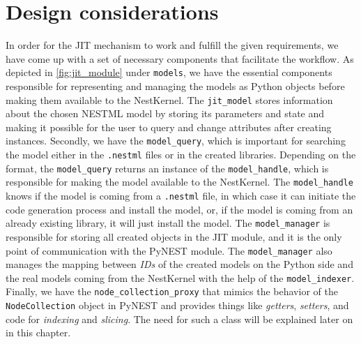 

\section{Design considerations}

In order for the JIT mechanism to work and fulfill the given requirements, we have come up with a set of necessary components that facilitate the workflow. As depicted in \autoref{fig:jit_module} under \texttt{models}, we have the essential components responsible for representing and managing the models as Python objects before making them available to the NestKernel. The \texttt{jit\_model} stores information about the chosen NESTML model by storing its parameters and state and making it possible for the user to query and change attributes after creating instances. Secondly, we have the \texttt{model\_query}, which is important for searching the model either in the \texttt{.nestml} files or in the created libraries. Depending on the format, the \texttt{model\_query} returns an instance of the \texttt{model\_handle}, which is responsible for making the model available to the NestKernel. The \texttt{model\_handle} knows if the model is coming from a \texttt{.nestml} file, in which case it can initiate the code generation process and install the model, or, if the model is coming from an already existing library, it will just install the model. The \texttt{model\_manager} is responsible for storing all created objects in the JIT module, and it is the only point of communication with the PyNEST module. The \texttt{model\_manager} also manages the mapping between \emph{IDs} of the created models on the Python side and the real models coming from the NestKernel with the help of the \texttt{model\_indexer}. Finally, we have the \texttt{node\_collection\_proxy} that mimics the behavior of the \texttt{NodeCollection} object in PyNEST and provides things like \emph{getters}, \emph{setters}, and code for \emph{indexing} and \emph{slicing}. The need for such a class will be explained later on in this chapter.

